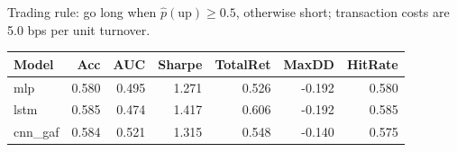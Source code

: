 Trading rule: go long when $\hat p(\text{up})\ge 0.5$, otherwise short; transaction costs are 5.0 bps per unit turnover.
\begin{table}[H]
\centering
\small
\begin{tabular}{lrrrrrr}
\toprule
Model & Acc & AUC & Sharpe & TotalRet & MaxDD & HitRate\\
\midrule
mlp & 0.580 & 0.495 & 1.271 & 0.526 & -0.192 & 0.580 \\
lstm & 0.585 & 0.474 & 1.417 & 0.606 & -0.192 & 0.585 \\
cnn\_gaf & 0.584 & 0.521 & 1.315 & 0.548 & -0.140 & 0.575 \\
\bottomrule
\end{tabular}
\end{table}
